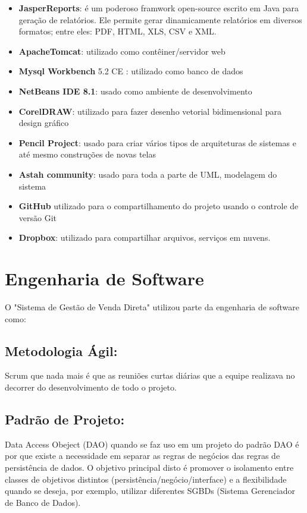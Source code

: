 \documentclass[chapter=TITLE,12pt,oneside,a4paper,english,french,sumario=tradicional,spanish,brazil,]{abntex2}
\begin{document}
\begin{itemize}
\item	 \textbf{JasperReports}: é um poderoso framwork open-source escrito em Java para geração de relatórios. Ele permite gerar dinamicamente relatórios em diversos formatos; entre eles: PDF, HTML, XLS, CSV e XML.

\item	\textbf{ApacheTomcat}: utilizado  como contêiner/servidor web

\item	\textbf{Mysql Workbench} 5.2 CE : utilizado como banco de dados

\item	\textbf{NetBeans IDE 8.1}: usado como ambiente de desenvolvimento

\item	\textbf{CorelDRAW}: utilizado para fazer desenho vetorial bidimensional para design gráfico

\item	\textbf{Pencil Project}: usado para criar vários tipos de arquiteturas de sistemas e até mesmo construções de novas telas

\item	\textbf{Astah community}: usado para toda a parte de UML, modelagem do sistema

\item	\textbf{GitHub} utilizado para o compartilhamento do projeto usando o controle de versão Git

\item	\textbf{Dropbox}: utilizado para compartilhar arquivos, serviços em nuvens.
\end{itemize}

\section{Engenharia de Software}
O "Sistema de Gestão de Venda Direta" utilizou parte da engenharia de software como:

\subsection{Metodologia Ágil:}
Scrum que nada mais é que as reuniões curtas diárias que a equipe realizava no decorrer do desenvolvimento de todo o projeto.

\subsection{Padrão de Projeto:}
Data Access Obeject (DAO) quando se faz uso em um projeto do padrão DAO é por que existe a necessidade em separar as regras de negócios das regras de persistência de dados. O objetivo principal disto é promover o isolamento entre classes de objetivos distintos (persistência/negócio/interface) e a flexibilidade quando se deseja, por exemplo, utilizar diferentes SGBDs (Sistema Gerenciador de Banco de Dados).
\end{document}

